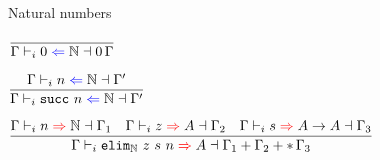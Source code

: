 \documentclass{beamer}
\begin{document}

\begin{frame}{Natural numbers}

\begin{center}
  $\infrule{}{\checktype{\Gamma}{\zero}{\Nat}{\scalectx{\Zero}{\Gamma}}}$

  \vspace{2em}

  $\infrule{\checktype{\Gamma}{n}{\Nat}{\Gamma'}}{\checktype{\Gamma}{\succ{n}}{\Nat}{\Gamma'}}$

  \vspace{2em}

  $\infrule{\infertype{\Gamma}{n}{\Nat}{\Gamma_1} \quad \infertype{\Gamma}{z}{A}{\Gamma_2} \quad \infertype{\Gamma}{s}{\Fun{A}{A}}{\Gamma_3}}{\infertype{\Gamma}{\natelim{z}{s}{n}}{A}{\addctx{\Gamma_1}{\addctx{\Gamma_2}{\scalectx{\Any}{\Gamma_3}}}}}$
\end{center}

\end{frame}
\end{document}
